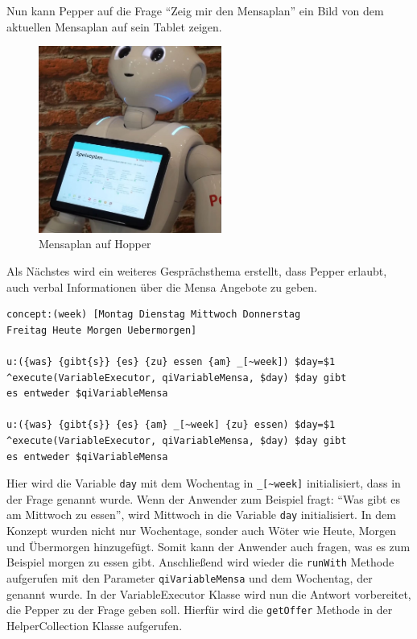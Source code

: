 Nun kann Pepper auf die Frage ``Zeig mir den Mensaplan'' ein Bild von dem aktuellen Mensaplan auf sein Tablet zeigen. \\

\begin{figure}[H]
    \centering
    \includegraphics[width=6cm]{Figures/AppChapter/rx2.JPG}
    \caption{Mensaplan auf Hopper}
    \label{fig:mensaplanPepper}
    \centering
\end{figure}

Als Nächstes wird ein weiteres Gesprächsthema erstellt, dass Pepper erlaubt, auch verbal Informationen über die Mensa Angebote zu geben.\\

\begin{lstlisting}
concept:(week) [Montag Dienstag Mittwoch Donnerstag 
Freitag Heute Morgen Uebermorgen]

u:({was} {gibt{s}} {es} {zu} essen {am} _[~week]) $day=$1 
^execute(VariableExecutor, qiVariableMensa, $day) $day gibt 
es entweder $qiVariableMensa

u:({was} {gibt{s}} {es} {am} _[~week] {zu} essen) $day=$1 
^execute(VariableExecutor, qiVariableMensa, $day) $day gibt 
es entweder $qiVariableMensa
\end{lstlisting}

Hier wird die Variable \verb|day| mit dem Wochentag in  \verb|_[~week]| initialisiert, dass in der Frage genannt wurde. Wenn der Anwender zum Beispiel fragt: ``Was gibt es am Mittwoch zu essen'', wird Mittwoch in die Variable \verb|day| initialisiert. In dem Konzept wurden nicht nur Wochentage, sonder auch Wöter wie Heute, Morgen und Übermorgen hinzugefügt. Somit kann der Anwender auch fragen, was es zum Beispiel morgen zu essen gibt. Anschließend wird wieder die \verb|runWith| Methode aufgerufen mit den Parameter \verb|qiVariableMensa| und dem Wochentag, der genannt wurde. In der VariableExecutor Klasse wird nun die Antwort vorbereitet, die Pepper zu der Frage geben soll. Hierfür wird die \verb|getOffer| Methode in 
der HelperCollection Klasse aufgerufen.\\

